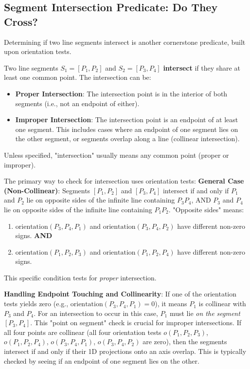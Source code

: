 \subsection{Segment Intersection Predicate: Do They Cross?}
\label{ssec:A.1.5}

Determining if two line segments intersect is another cornerstone predicate, built upon orientation tests.

\begin{definition}
\label{def:A.1.5.segment_intersection}
Two line segments $S_1 = [P_1, P_2]$ and $S_2 = [P_3, P_4]$ \textbf{intersect} if they share at least one common point.
The intersection can be:
\begin{itemize}
    \item \textbf{Proper Intersection}: The intersection point is in the interior of both segments (i.e., not an endpoint of either).
    \item \textbf{Improper Intersection}: The intersection point is an endpoint of at least one segment. This includes cases where an endpoint of one segment lies on the other segment, or segments overlap along a line (collinear intersection).
\end{itemize}
Unless specified, "intersection" usually means any common point (proper or improper).
\end{definition}

\begin{intuition}
\label{intuition:A.1.5.segment_intersection_orientation}
The primary way to check for intersection uses orientation tests:
\textbf{General Case (Non-Collinear)}:
Segments $[P_1, P_2]$ and $[P_3, P_4]$ intersect if and only if $P_1$ and $P_2$ lie on opposite sides of the infinite line containing $P_3P_4$, AND $P_3$ and $P_4$ lie on opposite sides of the infinite line containing $P_1P_2$.
"Opposite sides" means:
\begin{enumerate}
    \item $\text{orientation}(P_3, P_4, P_1)$ and $\text{orientation}(P_3, P_4, P_2)$ have different non-zero signs.
    \textbf{AND}
    \item $\text{orientation}(P_1, P_2, P_3)$ and $\text{orientation}(P_1, P_2, P_4)$ have different non-zero signs.
\end{enumerate}
This specific condition tests for \textit{proper} intersection.

\textbf{Handling Endpoint Touching and Collinearity}:
If one of the orientation tests yields zero (e.g., $\text{orientation}(P_3, P_4, P_1) = 0$), it means $P_1$ is collinear with $P_3$ and $P_4$. For an intersection to occur in this case, $P_1$ must lie \textit{on the segment} $[P_3, P_4]$. This "point on segment" check is crucial for improper intersections.
If all four points are collinear (all four orientation tests $o(P_1,P_2,P_3)$, $o(P_1,P_2,P_4)$, $o(P_3,P_4,P_1)$, $o(P_3,P_4,P_2)$ are zero), then the segments intersect if and only if their 1D projections onto an axis overlap. This is typically checked by seeing if an endpoint of one segment lies on the other.
\end{intuition}

